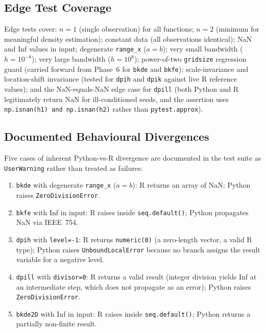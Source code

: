 \documentclass[12pt,a4paper]{article}
\begin{document}
\subsection{Edge Test Coverage}

Edge tests cover: $n=1$ (single observation) for all functions; $n=2$ (minimum for meaningful density estimation); constant data (all observations identical); NaN and Inf values in input; degenerate \texttt{range\_x} ($a = b$); very small bandwidth ($h = 10^{-8}$); very large bandwidth ($h = 10^{8}$); power-of-two \texttt{gridsize} regression guard (carried forward from Phase~6 for \texttt{bkde} and \texttt{bkfe}); scale-invariance and location-shift invariance (tested for \texttt{dpih} and \texttt{dpik} against live R reference values); and the NaN-equals-NaN edge case for \texttt{dpill} (both Python and R legitimately return NaN for ill-conditioned seeds, and the assertion uses \texttt{np.isnan(h1) and np.isnan(h2)} rather than \texttt{pytest.approx}).

\subsection{Documented Behavioural Divergences}

Five cases of inherent Python-vs-R divergence are documented in the test suite as \texttt{UserWarning} rather than treated as failures:
\begin{enumerate}
\item \texttt{bkde} with degenerate \texttt{range\_x} ($a = b$): R returns an array of NaN; Python raises \texttt{ZeroDivisionError}.
\item \texttt{bkfe} with Inf in input: R raises inside \texttt{seq.default()}; Python propagates NaN via IEEE~754.
\item \texttt{dpih} with \texttt{level=-1}: R returns \texttt{numeric(0)} (a zero-length vector, a valid R type); Python raises \texttt{UnboundLocalError} because no branch assigns the result variable for a negative level.
\item \texttt{dpill} with \texttt{divisor=0}: R returns a valid result (integer division yields Inf at an intermediate step, which does not propagate as an error); Python raises \texttt{ZeroDivisionError}.
\item \texttt{bkde2D} with Inf in input: R raises inside \texttt{seq.default()}; Python returns a partially non-finite result.
\end{enumerate}

\clearpage
\end{document}
